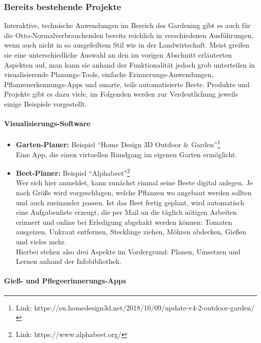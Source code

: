 \hypertarget{bereits-bestehende-projekte}{%
\subsubsection{Bereits bestehende
Projekte}\label{bereits-bestehende-projekte}}

Interaktive, technische Anwendungen im Bereich des Gardening gibt es
auch für die Otto-Normalverbrauchenden bereits reichlich in
verschiedenen Ausführungen, wenn auch nicht in so ausgefeiltem Stil wie
in der Landwirtschaft. Meist greifen sie eine unterschiedliche Auswahl
an den im vorigen Abschnitt erläuterten Aspekten auf, man kann sie
anhand der Funktionalität jedoch grob unterteilen in visualisierende
Planungs-Tools, einfache Erinnerungs-Anwendungen,
Pflanzenerkennungs-Apps und smarte, teils automatisierte Beete. Produkte
und Projekte gibt es dazu viele, im Folgenden werden zur Verdeutlichung
jeweils einige Beispiele vorgestellt.

\hypertarget{visualisierungs-software}{%
\paragraph{Visualisierungs-Software}\label{visualisierungs-software}}

\begin{itemize}
\item
  \textbf{Garten-Planer:} Beispiel ``Home Design 3D Outdoor \&
  Garden''\footnote{Link:
    https://en.homedesign3d.net/2018/10/09/update-v4-2-outdoor-garden/}\\
  Eine App, die einen virtuellen Rundgang im eigenen Garten ermöglicht.
\item
  \textbf{Beet-Planer:} Beispiel ``Alphabeet''\footnote{Link:
    https://www.alphabeet.org/}\\
  Wer sich hier anmeldet, kann zunächst einmal seine Beete digital
  anlegen. Je nach Größe wird vorgeschlagen, welche Pflanzen wo angebaut
  werden sollten und auch zueinander passen. Ist das Beet fertig
  geplant, wird automatisch eine Aufgabenliste erzeugt, die per Mail an
  die täglich nötigen Arbeiten erinnert und online bei Erledigung
  abgehakt werden können: Tomaten ausgeizen, Unkraut entfernen,
  Stecklinge ziehen, Möhren abdecken, Gießen und vieles mehr.\\
  Hierbei stehen also drei Aspekte im Vordergrund: Planen, Umsetzen und
  Lernen anhand der Infobibliothek.
\end{itemize}

\hypertarget{gieuxdf--und-pflegeerinnerungs-apps}{%
\paragraph{Gieß- und
Pflegeerinnerungs-Apps}\label{gieuxdf--und-pflegeerinnerungs-apps}}

